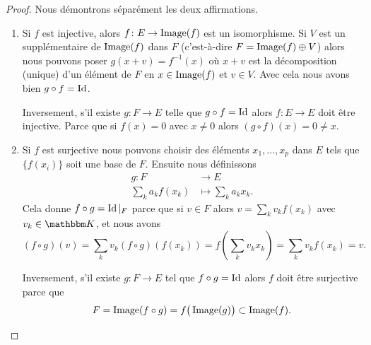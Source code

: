 \begin{proof}
    Nous démontrons séparément les deux affirmations.
    \begin{enumerate}
        \item
            Si \( f\) est injective, alors \( f\colon E\to \operatorname{Image}(f)\) est un isomorphisme. Si $V$ est un supplémentaire de \( \operatorname{Image}(f)\) dans \( F\) (c'est-à-dire \( F=\operatorname{Image}(f)\oplus V\)) alors nous pouvons poser \( g(x+v)=f^{-1}(x)\) où \( x+v\) est la décomposition (unique) d'un élément de \( F\) en \( x\in\operatorname{Image}(f)\) et \( v\in V\). Avec cela nous avons bien \( g\circ f=\operatorname{Id}\).

            Inversement, s'il existe \( g\colon F\to E\) telle que \( g\circ f=\operatorname{Id}\) alors \( f\colon E\to E\) doit être injective. Parce que si \( f(x)=0\) avec \( x\neq 0\) alors \( (g\circ f)(x)=0\neq x\).
        \item
            Si \( f\) est surjective nous pouvons choisir des éléments \( x_1,\ldots, x_p\) dans \( E\) tels que \( \{ f(x_i) \}\) soit une base de \( F\). Ensuite nous définissons
            \begin{equation}
                \begin{aligned}
                    g\colon F&\to E \\
                    \sum_k a_k f(x_k)&\mapsto \sum_k a_k x_k.
                \end{aligned}
            \end{equation}
            Cela donne \(  f\circ g=\operatorname{Id}|_F\) parce que si \( v\in F\) alors \( v=\sum_kv_kf(x_k)\) avec \( v_k\in \eK\), et nous avons
            \begin{equation}
                (f\circ g)(v)=\sum_k v_k (f\circ g) \left(f(x_k)\right)
                             =f\left( \sum_k v_k x_k \right)
                             =\sum_k v_k f(x_k) = v.
            \end{equation}

            Inversement, s'il existe \( g\colon F\to E\) tel que \( f\circ g=\operatorname{Id}\) alors \( f\) doit être surjective parce que
            \begin{equation}
                F=\operatorname{Image}(f\circ g)=f\big( \operatorname{Image}(g) \big)\subset \operatorname{Image}(f).
            \end{equation}
    \end{enumerate}
\end{proof}




